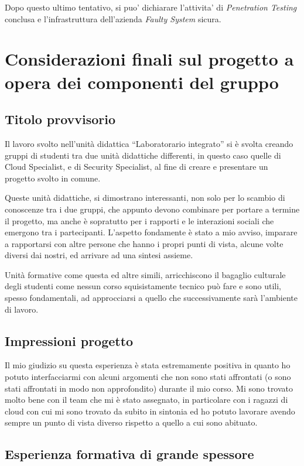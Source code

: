 \documentclass[a4paper]{report}
\newcommand{\quotes}[1]{``#1''}
\begin{document}
		Dopo questo ultimo tentativo, si puo' dichiarare l'attivita' di \emph{Penetration Testing} conclusa e
		l'infrastruttura dell'azienda \emph{Faulty System} sicura.

\chapter{Considerazioni finali sul progetto a opera dei componenti del gruppo}
	\section{Titolo provvisorio}
	\author{Riccardo De Lazzari}

	Il lavoro svolto nell'unità didattica \quotes{Laboratorario integrato} si è svolta creando gruppi di studenti tra
	due unità didattiche differenti, in questo caso quelle di Cloud Specialist, e di Security Specialist, al fine di
	creare e presentare un progetto svolto in comune.
	
	Queste unità didattiche, si dimostrano interessanti, non solo per lo scambio di conoscenze tra i due gruppi, che
	appunto devono combinare per portare a termine il progetto, ma anche è sopratutto per i rapporti e le interazioni
	sociali che emergono tra i partecipanti. L'aspetto fondamente è stato a mio avviso, imparare a rapportarsi con altre
	persone che hanno i propri punti di vista, alcune volte diversi dai nostri, ed arrivare ad una sintesi assieme.
	
	Unità formative come questa ed altre simili, arricchiscono il bagaglio culturale degli studenti come nessun corso
	squisistamente tecnico può fare e sono utili, spesso fondamentali, ad approcciarsi a quello che successivamente sarà
	l'ambiente di lavoro.

	\section{Impressioni progetto}
	\author{Lorenzo Dellera}

	Il mio giudizio su questa esperienza è stata estremamente positiva in quanto ho potuto interfacciarmi con alcuni argomenti che non sono stati affrontati (o sono stati affrontati in modo non approfondito) durante il mio corso. Mi sono trovato molto bene con il team che mi è stato assegnato, in particolare con i ragazzi di cloud con cui mi sono trovato da subito in sintonia ed ho potuto lavorare avendo sempre un punto di vista diverso rispetto a quello a cui sono abituato.
	\section{Esperienza formativa di grande spessore}
	\author{Riccardo Oglietti}
\end{document}
